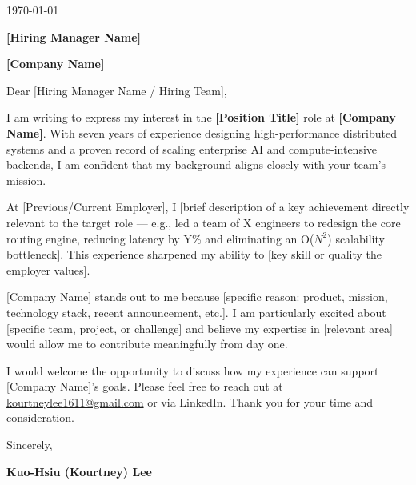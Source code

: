 \vspace{1em}
{\fontsize{10.5}{12}\selectfont\today\par}

\vspace{0.8em}
{\fontsize{10.5}{12}\selectfont
  \textbf{[Hiring Manager Name]}\par    %
  \textbf{[Company Name]}\par
  [Company Address Line 1]\par          %
  [City, Province/State, Postal Code]\par
}

\vspace{0.8em}
{\fontsize{10.5}{13}\selectfont
Dear [Hiring Manager Name / Hiring Team],\par

\vspace{0.6em}
I am writing to express my interest in the \textbf{[Position Title]} role at
\textbf{[Company Name]}.
With seven years of experience designing high-performance distributed systems and
a proven record of scaling enterprise AI and compute-intensive backends, I am
confident that my background aligns closely with your team's mission.

\vspace{0.6em}
At [Previous/Current Employer], I [brief description of a key achievement
directly relevant to the target role — e.g., led a team of X engineers to
redesign the core routing engine, reducing latency by Y\% and eliminating an
O(\(N^2\)) scalability bottleneck]. This experience sharpened my ability to
[key skill or quality the employer values].

\vspace{0.6em}
[Company Name] stands out to me because [specific reason: product, mission,
technology stack, recent announcement, etc.].
I am particularly excited about [specific team, project, or challenge] and
believe my expertise in [relevant area] would allow me to contribute
meaningfully from day one.

\vspace{0.6em}
I would welcome the opportunity to discuss how my experience can support
[Company Name]'s goals. Please feel free to reach out at
\href{mailto:kourtneylee1611@gmail.com}{kourtneylee1611@gmail.com} or via
LinkedIn. Thank you for your time and consideration.

\vspace{1em}
Sincerely,\par
\vspace{2.5em}          %
\textbf{Kuo-Hsiu (Kourtney) Lee}\par
}
